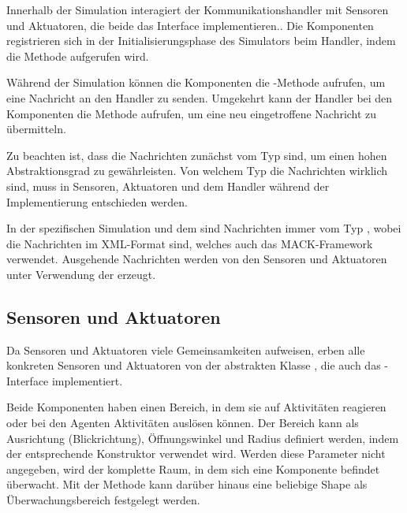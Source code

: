 Innerhalb der Simulation interagiert der Kommunikationshandler mit Sensoren und Aktuatoren, die beide das Interface  implementieren.. Die Komponenten registrieren sich in der Initialisierungsphase des Simulators beim Handler, indem die Methode  aufgerufen wird.

Während der Simulation können die Komponenten die -Methode aufrufen, um eine Nachricht an den Handler zu senden. Umgekehrt kann der Handler bei den Komponenten die Methode  aufrufen, um eine neu eingetroffene Nachricht zu übermitteln.

Zu beachten ist, dass die Nachrichten zunächst vom Typ  sind, um einen hohen Abstraktionsgrad zu gewährleisten. Von welchem Typ die Nachrichten wirklich sind, muss in Sensoren, Aktuatoren und dem Handler während der Implementierung entschieden werden.

In der spezifischen Simulation und dem  sind Nachrichten immer vom Typ , wobei die Nachrichten im XML-Format sind, welches auch das MACK-Framework verwendet. Ausgehende Nachrichten werden von den Sensoren und Aktuatoren unter Verwendung der  erzeugt.


\subsection{Sensoren und Aktuatoren}\label{subsec:concept_actuators_sensors}
Da Sensoren und Aktuatoren viele Gemeinsamkeiten aufweisen, erben alle konkreten Sensoren und Aktuatoren von der abstrakten Klasse , die auch das -Interface implementiert.

Beide Komponenten haben einen Bereich, in dem sie auf Aktivitäten reagieren oder bei den Agenten Aktivitäten auslösen können. Der Bereich kann als Ausrichtung (Blickrichtung), Öffnungswinkel und Radius definiert werden, indem der entsprechende Konstruktor verwendet wird. Werden diese Parameter nicht angegeben, wird der komplette Raum, in dem sich eine Komponente befindet überwacht. Mit der Methode  kann darüber hinaus eine beliebige Shape als Überwachungsbereich festgelegt werden.

